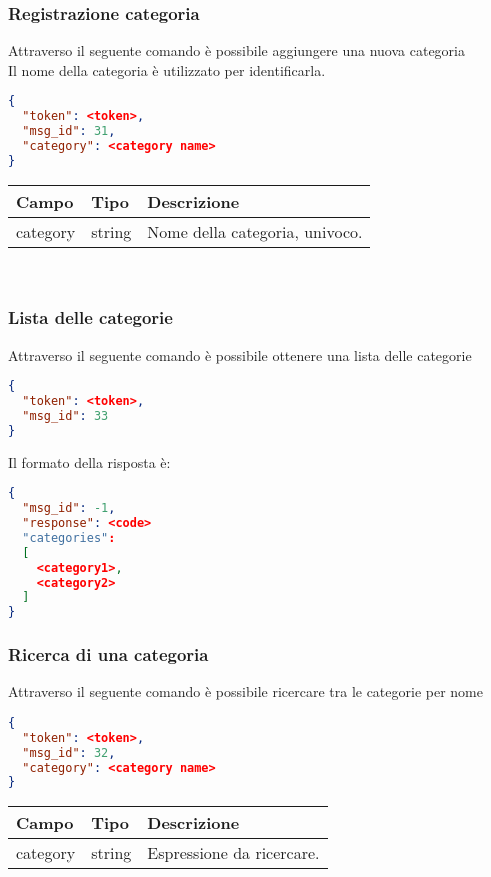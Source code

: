 \subsubsection{Registrazione categoria}
Attraverso il seguente comando è possibile aggiungere una nuova categoria\\
Il nome della categoria è utilizzato per identificarla.

\begin{lstlisting}[language=json]
{
  "token": <token>,
  "msg_id": 31,
  "category": <category name>
}
\end{lstlisting}

\begin{tabular}{|l | l | l |}
\hline
Campo & Tipo & Descrizione \\ \hline
category & string & Nome della categoria, univoco.\\ \hline
\end{tabular} \\
\subsubsection{Lista delle categorie} \label{sssec:lc}
Attraverso il seguente comando è possibile ottenere una lista delle categorie
\begin{lstlisting}[language=json]
{
  "token": <token>,
  "msg_id": 33
}
\end{lstlisting}

Il formato della risposta è:
\begin{lstlisting}[language=json]
{
  "msg_id": -1,
  "response": <code>
  "categories":
  [
    <category1>,
    <category2>
  ]
}
\end{lstlisting}
\subsubsection{Ricerca di una categoria} \label{sssec:rc}
Attraverso il seguente comando è possibile ricercare tra le categorie per nome
\begin{lstlisting}[language=json]
{
  "token": <token>,
  "msg_id": 32,
  "category": <category name>
}
\end{lstlisting}

\begin{tabular}{|l | l | l |}
\hline
Campo & Tipo & Descrizione \\ \hline
category & string & Espressione da ricercare.\\ \hline
\end{tabular} \\

